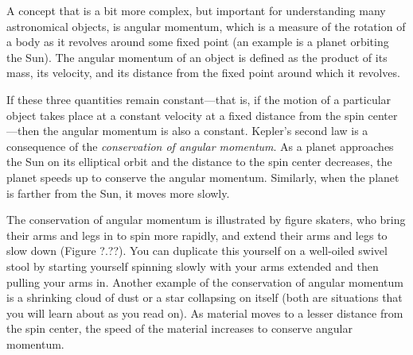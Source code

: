 \documentclass[main-astronomy.tex]{subfiles}
\begin{document}
A concept that is a bit more complex, but important for understanding many astronomical objects, is \gls{angular momentum}, which is a measure of the rotation of a body as it revolves around some fixed point (an example is a planet orbiting the Sun). The angular momentum of an object is defined as the product of its mass, its velocity, and its distance from the fixed point around which it revolves.

\vspace{1em}

If these three quantities remain constant---that is, if the motion of a particular object takes place at a constant velocity at a fixed distance from the spin center---then the angular momentum is also a constant. Kepler’s second law is a consequence of the \textit{conservation of angular momentum}. As a planet approaches the Sun on its elliptical orbit and the distance to the spin center decreases, the planet speeds up to conserve the angular momentum. Similarly, when the planet is farther from the Sun, it moves more slowly.

\vspace{1em}

The conservation of angular momentum is illustrated by figure skaters, who bring their arms and legs in to spin more rapidly, and extend their arms and legs to slow down (Figure ?.??). You can duplicate this yourself on a well-oiled swivel stool by starting yourself spinning slowly with your arms extended and then pulling your arms in. Another example of the conservation of angular momentum is a shrinking cloud of dust or a star collapsing on itself (both are situations that you will learn about as you read on). As material moves to a lesser distance from the spin center, the speed of the material increases to conserve angular momentum.

\vspace{1em} %
\end{document}
